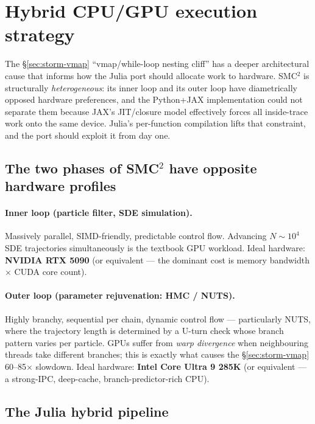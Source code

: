\documentclass[11pt,a4paper]{article}
\begin{document}
\section{Hybrid CPU/GPU execution strategy}
\label{sec:hybrid}

The §\ref{sec:storm-vmap} ``vmap/while-loop nesting cliff'' has a
deeper architectural cause that informs how the Julia port should
allocate work to hardware. SMC$^2$ is structurally
\emph{heterogeneous}: its inner loop and its outer loop have
diametrically opposed hardware preferences, and the Python+JAX
implementation could not separate them because JAX's JIT/closure
model effectively forces all inside-trace work onto the same device.
Julia's per-function compilation lifts that constraint, and the port
should exploit it from day one.

\subsection{The two phases of SMC$^2$ have opposite hardware
profiles}

\paragraph{Inner loop (particle filter, SDE simulation).} Massively
parallel, SIMD-friendly, predictable control flow. Advancing
$N \sim 10^4$ SDE trajectories simultaneously is the textbook
GPU workload. Ideal hardware: \textbf{NVIDIA RTX 5090} (or
equivalent --- the dominant cost is memory bandwidth $\times$ CUDA
core count).

\paragraph{Outer loop (parameter rejuvenation: HMC / NUTS).}
Highly branchy, sequential per chain, dynamic control flow ---
particularly NUTS, where the trajectory length is determined by a
U-turn check whose branch pattern varies per particle. GPUs
suffer from \emph{warp divergence} when neighbouring threads take
different branches; this is exactly what causes the §\ref{sec:storm-vmap}
60--85$\times$ slowdown. Ideal hardware: \textbf{Intel Core
Ultra 9 285K} (or equivalent --- a strong-IPC, deep-cache,
branch-predictor-rich CPU).

\subsection{The Julia hybrid pipeline}
\end{document}
